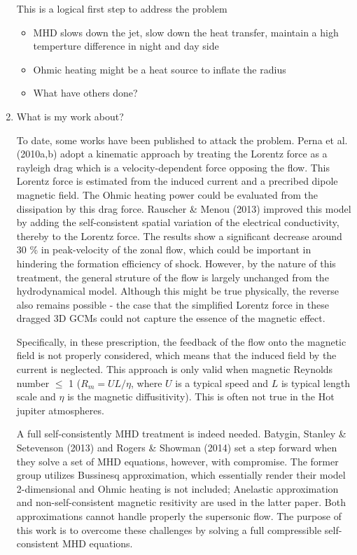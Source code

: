 \documentclass[11pt]{article}
\begin{document}
\begin{enumerate}
This is a logical first step to address the problem


\begin{itemize}
\item MHD slows down the jet, slow down the heat transfer, maintain a high temperture difference in night and day side
\item Ohmic heating might be a heat source to inflate the radius
\item What have others done?
\end{itemize}



\item What is my work about?

To date, some works have been published to attack the problem. Perna et al. (2010a,b) adopt a kinematic approach by treating the Lorentz force as a rayleigh drag which is a velocity-dependent force opposing the flow. This Lorentz force is estimated from the induced current and a precribed dipole magnetic field. The Ohmic heating power could be evaluated from the dissipation by this drag force. Rauscher \& Menou (2013) improved this model by adding the self-consistent spatial variation of the electrical conductivity, thereby to the Lorentz force. The results show a significant decrease around ~ 30 \% in peak-velocity of the zonal flow, which could be important in hindering the formation efficiency of shock. However, by the nature of this treatment, the general struture of the flow is largely unchanged from the hydrodynamical model. Although this might be true physically, the reverse also remains possible - the case that the simplified Lorentz force in these dragged 3D GCMs could not capture the essence of the magnetic effect. 

Specifically, in these prescription, the feedback of the flow onto the magnetic field is not properly considered, which means that the induced field by the current is neglected. This approach is only valid when magnetic Reynolds number $\leq$ 1 ($R_m = UL/\eta$, where  $U$ is a typical speed and $L$ is typical length scale and $\eta$ is the magnetic diffusitivity). This is often not true in the Hot jupiter atmospheres.

A full self-consistently MHD treatment is indeed needed. Batygin, Stanley \& Setevenson (2013) and Rogers \& Showman (2014) set a step forward when they solve a set of MHD equations, however, with compromise. The former group utilizes Bussinesq approximation, which essentially render their model 2-dimensional and Ohmic heating is not included; Anelastic approximation and non-self-consistent magnetic resitivity are used in the latter paper. Both approximations cannot handle properly the supersonic flow. The purpose of this work is to overcome these challenges by solving a full compressible self-consistent MHD equations. 


\end{enumerate}
\end{document}
